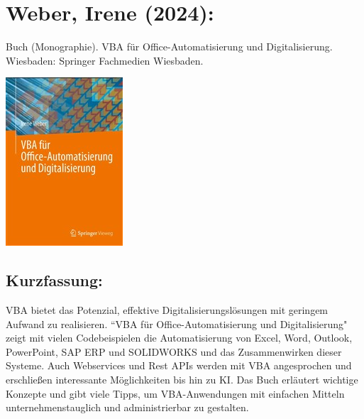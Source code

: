 \section*{Weber, Irene (2024):}
Buch (Monographie). VBA für Office-Automatisierung und Digitalisierung.
Wiesbaden: Springer Fachmedien Wiesbaden.
 \\
\begin{minipage}{0.5\textwidth}
	\includegraphics[width=\linewidth]{../Appendix/Literaturverzeichnis/img/Weber.jpg}
\end{minipage}
\hfill
\begin{minipage}{0.48\textwidth}
\subsection*{Kurzfassung:}
VBA bietet das Potenzial, effektive Digitalisierungslösungen mit geringem Aufwand zu realisieren. “VBA für Office-Automatisierung und Digitalisierung" zeigt mit vielen Codebeispielen die Automatisierung von Excel, Word, Outlook, PowerPoint, SAP ERP und SOLIDWORKS und das Zusammenwirken dieser Systeme. Auch Webservices und Rest APIs werden mit VBA angesprochen und erschließen interessante Möglichkeiten bis hin zu KI. Das Buch erläutert wichtige Konzepte und gibt viele Tipps, um VBA-Anwendungen mit einfachen Mitteln unternehmenstauglich und administrierbar zu gestalten.
\end{minipage}
